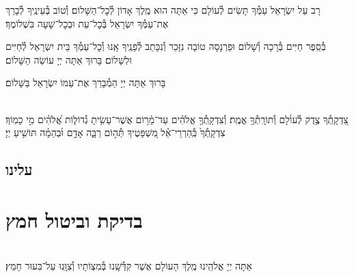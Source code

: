 \documentclass[twoside, openany, parskip=half, 11pt]{book}
\begin{document}
\retzeh

\yaalehveyavo

\zion

\modim

\shabboschanukah

\shabboshodos

רָב עַל יִשְׂרָאֵל עַמְּ֯ךָ תָּשִׂים לְ֯עוֹלָם כִּי אַתָּה הוּא מֶֽלֶךְ אָדוֹן לְ֯כׇל־הַשָּׁלוֹם׃ וְ֯טוֹב בְּ֯עֵינֶֽיךָ לְ֯בָרֵךְ אֶת־עַמְּ֯ךָ יִשְׂרָאֵל בְּ֯כׇל־עֵת וּבְכׇל־שָׁעָה בִּשְׁלוֹמֶךָ׃
\vspace{-0.4\baselineskip}
\begin{paracol}{2}

\begin{small}
בְּ֯סֵֽפֶר חַיִּים בְּ֯רָכָה וְ֯שָׁלוֹם וּפַרְנָסָה טוֹבָה נִזָּכֵר וְ֯נִכָּתֵב לְ֯פָנֶֽיךָ אָֽנוּ וְ֯כׇל־עַמְּ֯ךָ בֵּית יִשְׂרָאֵל לְ֯חַיִּים וּלְשָׁלוֹם׃ בָּרוּךְ אַתָּה יְיָ עוֹשֵׂה הַשָּׁלוֹם׃

\end{small}
\switchcolumn
בָּרוּךְ אַתָּה יְיָ הַמְ֯בָרֵךְ אֶת־עַמּוֹ יִשְׂרָאֵל בַּשָּׁלוֹם׃

\end{paracol}

\tachanunim

\\
צִ֭דְקָֽתְ֯ךָ צֶ֥דֶק לְ֯עוֹ֗לָם וְ֯תוֹרָֽתְ֯ךָ֥ אֱמֶֽת׃ וְ֯צִדְקָֽתְ֯ךָ֥ אֱלֹהִ֗ים עַד־מָ֫ר֥וֹם אֲשֶׁר־עָשִׂ֥יתָ גְ֯דוֹל֑וֹת אֱ֝לֹהִ֗ים מִ֣י כָמֽוֹךָ׃ צִדְקָֽתְ֯ךָ֙ כְּֽ֯הַרְרֵי־אֵ֗ל מִ֭שְׁפָּטֶיךָ תְּ֯ה֣וֹם רַבָּ֑ה אָדָ֥ם וּ֜בְהֵמָ֗ה תּוֹשִׁ֥יעַ יְיָ׃

\fullkaddish

\section*{ עלינו }

\aleinu





%
\chapter[בדיקת וביטול חמץ]{ בדיקת וביטול חמץ }

\\
אַתָּה יְיָ אֱלֹהֵֽינוּ מֶֽלֶךְ הָעוֹלָם אֲשֶׁר קִדְּ֯שָֽׁנוּ בְּ֯מִצְוֹתָיו וְ֯צִוָּֽנוּ עַל־בִּעוּר חָמֵץ׃
\end{document}
